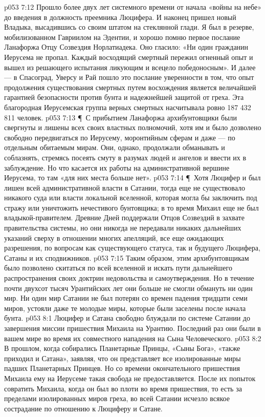 \vs p053 7:12 Прошло более двух лет системного времени от начала «войны на небе» до введения в должность преемника Люцифера. И наконец пришел новый Владыка, высадившись со своим штатом на стеклянной глади. Я был в резерве, мобилизованном Гавриилом на Эдентии, и хорошо помню первое послание Ланафоржа Отцу Созвездия Норлатиадека. Оно гласило: «Ни один гражданин Иерусема не пропал. Каждый восходящий смертный пережил огненный опыт и вышел из решающего испытания ликующим и всецело победоносным». И далее --- в Спасоград, Уверсу и Рай пошло это послание уверенности в том, что опыт продолжения существования смертных путем восхождения является величайшей гарантией безопасности против бунта и надежнейшей защитой от греха. Эта благородная Иерусемская группа верных смертных насчитывала ровно 187 432 811 человек.
\vs p053 7:13 \P\ С прибытием Ланафоржа архибунтовщики были свергнуты и лишены всех своих властных полномочий, хотя им и было дозволено свободно передвигаться по Иерусему, моронтийным сферам и даже --- по отдельным обитаемым мирам. Они, однако, продолжали обманывать и соблазнять, стремясь посеять смуту в разумах людей и ангелов и ввести их в заблуждение. Но что касается их работы на административной вершине Иерусема, то там «для них места больше нет».
\vs p053 7:14 \P\ Хотя Люцифер и был лишен всей административной власти в Сатании, тогда еще не существовало никакого суда или власти локальной вселенной, которая могла бы заключить под стражу или уничтожить нечестивого бунтовщика; в то время Михаил еще не был владыкой\hyp{}правителем. Древние Дней поддержали Отцов Созвездий в захвате правительства системы, но они никогда не передавали никаких дальнейших указаний сверху в отношении многих апелляций, все еще ожидающих разрешения, по вопросам как существующего статуса, так и будущего Люцифера, Сатаны и их сподвижников.
\vs p053 7:15 Таким образом, этим архибунтовщикам было позволено скитаться по всей вселенной и искать пути дальнейшего распространения своих доктрин недовольства и самоутверждения. Но в течение почти двухсот тысяч Урантийских лет они больше не смогли обмануть ни один мир. Ни один мир Сатании не был потерян со времен падения тридцати семи миров, устояли даже те молодые миры, которые были заселены после начала бунта.
\vs p053 8:1 Люцифер и Сатана свободно блуждали по системе Сатании до завершения миссии пришествия Михаила на Урантию. Последний раз они были в вашем мире во время их совместного нападения на Сына Человеческого.
\vs p053 8:2 В прошлом, когда собирались Планетарные Принцы, «Сыны Бога», «также приходил и Сатана», заявляя, что он представляет все изолированные миры падших Планетарных Принцев. Но со времени окончательного пришествия Михаила ему на Иерусеме такая свобода не предоставляется. После их попыток совратить Михаила, когда он был во плоти во время пришествия, то есть за пределами изолированных миров греха, во всей Сатании исчезло всякое сострадание по отношению к Люциферу и Сатане.
